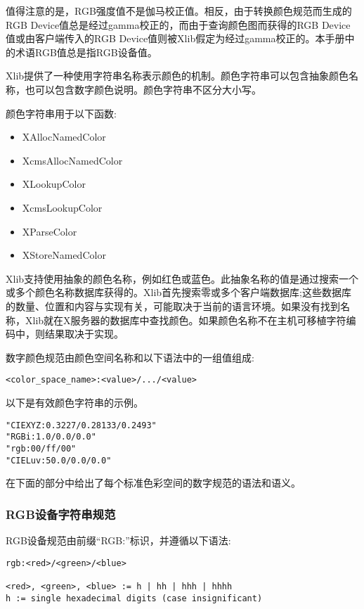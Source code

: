值得注意的是，RGB强度值不是伽马校正值。相反，由于转换颜色规范而生成的RGB Device值总是经过gamma校正的，而由于查询颜色图而获得的RGB Device值或由客户端传入的RGB Device值则被Xlib假定为经过gamma校正的。本手册中的术语RGB值总是指RGB设备值。

Xlib提供了一种使用字符串名称表示颜色的机制。颜色字符串可以包含抽象颜色名称，也可以包含数字颜色说明。颜色字符串不区分大小写。

颜色字符串用于以下函数:
\begin{itemize}
	\item XAllocNamedColor
	\item XcmsAllocNamedColor
	\item XLookupColor
	\item XcmsLookupColor
	\item XParseColor
	\item XStoreNamedColor
\end{itemize}

Xlib支持使用抽象的颜色名称，例如红色或蓝色。此抽象名称的值是通过搜索一个或多个颜色名称数据库获得的。Xlib首先搜索零或多个客户端数据库;这些数据库的数量、位置和内容与实现有关，可能取决于当前的语言环境。如果没有找到名称，Xlib就在X服务器的数据库中查找颜色。如果颜色名称不在主机可移植字符编码中，则结果取决于实现。

数字颜色规范由颜色空间名称和以下语法中的一组值组成:

\begin{lstlisting}
<color_space_name>:<value>/.../<value>
\end{lstlisting}

以下是有效颜色字符串的示例。

\begin{lstlisting}
"CIEXYZ:0.3227/0.28133/0.2493"
"RGBi:1.0/0.0/0.0"
"rgb:00/ff/00"
"CIELuv:50.0/0.0/0.0"
\end{lstlisting}

在下面的部分中给出了每个标准色彩空间的数字规范的语法和语义。


\subsubsection{RGB设备字符串规范}

RGB设备规范由前缀“RGB:”标识，并遵循以下语法:

\begin{lstlisting}
rgb:<red>/<green>/<blue>

<red>, <green>, <blue> := h | hh | hhh | hhhh
h := single hexadecimal digits (case insignificant)
\end{lstlisting}

